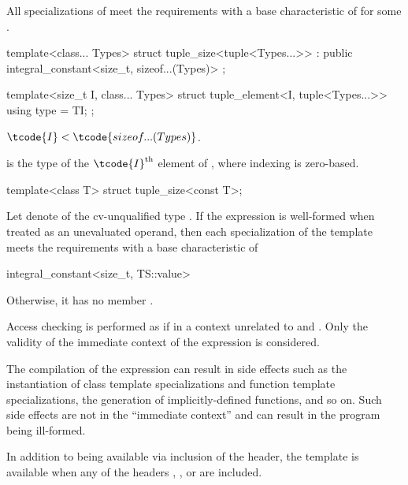 \begin{itemdescr}
\pnum
All specializations of  meet the
 requirements with a
base characteristic of 
for some .
\end{itemdescr}

%
\begin{itemdecl}
template<class... Types>
  struct tuple_size<tuple<Types...>> : public integral_constant<size_t, sizeof...(Types)> { };
\end{itemdecl}

%
\begin{itemdecl}
template<size_t I, class... Types>
  struct tuple_element<I, tuple<Types...>> {
    using type = TI;
  };
\end{itemdecl}

\begin{itemdescr}
\pnum
\mandates
$\tcode{I} < \tcode{sizeof...(Types)}$.

\pnum
\ctype
{} is the
type of the $\tcode{I}^\text{th}$ element of ,
where indexing is zero-based.
\end{itemdescr}

%
\begin{itemdecl}
template<class T> struct tuple_size<const T>;
\end{itemdecl}

\begin{itemdescr}
\pnum
Let  denote  of the cv-unqualified type .
If the expression  is well-formed
when treated as an unevaluated operand, then
each specialization of the template meets the  requirements
with a base characteristic of
\begin{codeblock}
integral_constant<size_t, TS::value>
\end{codeblock}
Otherwise, it has no member .

\pnum
Access checking is performed as if in a context
unrelated to  and .
Only the validity of the immediate context of the expression is considered.
\begin{note}
The compilation of the expression can result in side effects
such as the instantiation of class template specializations and
function template specializations, the generation of implicitly-defined functions, and so on.
Such side effects are not in the ``immediate context'' and
can result in the program being ill-formed.
\end{note}

\pnum
In addition to being available via inclusion of the  header,
the template is available
when any of the headers
,
, or
are included.
\end{itemdescr}


